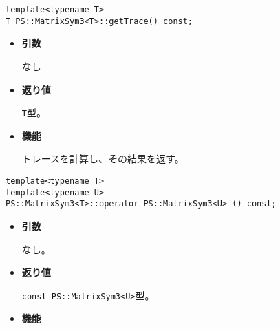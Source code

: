 
\begin{screen}
\begin{verbatim}
template<typename T>
T PS::MatrixSym3<T>::getTrace() const;
\end{verbatim}
\end{screen}

\begin{itemize}

\item{{\bf 引数}}

なし

\item{{\bf 返り値}}

{\tt T}型。

\item{{\bf 機能}}

  トレースを計算し、その結果を返す。

\end{itemize}


\begin{screen}
\begin{verbatim}
template<typename T>
template<typename U>
PS::MatrixSym3<T>::operator PS::MatrixSym3<U> () const;
\end{verbatim}
\end{screen}

\begin{itemize}

\item{{\bf 引数}}

  なし。

\item{{\bf 返り値}}

{\tt const PS::MatrixSym3<U>}型。

\item{{\bf 機能}}


\end{itemize}

